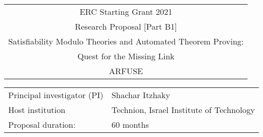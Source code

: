 
\newcommand\lntitle[1]{{\fontsize{14pt}{14pt}\selectfont #1}}

\begin{center}
\begin{tabular}{c}
ERC Starting Grant 2021 \\
Research Proposal [Part B1] \\[1em]
\lntitle{
Satisfiability Modulo Theories and Automated Theorem Proving:}\\[.3em]
\lntitle{Quest for the Missing Link} \\[1em]
ARFUSE
\end{tabular}
\end{center}

\bigskip
\noindent
\begin{tabular}{ll}
Principal investigator (PI) & Shachar Itzhaky \\
Host institution & Technion, Israel Institute of Technology \\
Proposal duration: & 60 months
\end{tabular}

